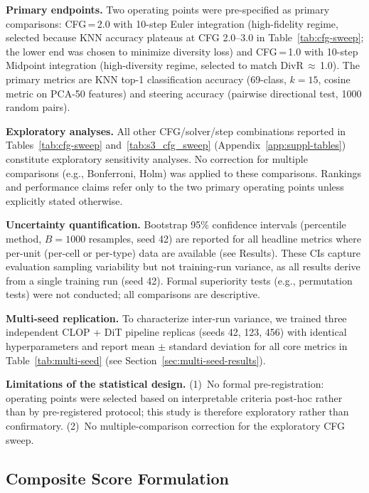 \documentclass[11pt,a4paper]{article}
\begin{document}
\textbf{Primary endpoints.} Two operating points were pre-specified as primary comparisons: CFG\,=\,2.0 with 10-step Euler integration (high-fidelity regime, selected because KNN accuracy plateaus at CFG 2.0--3.0 in Table~\ref{tab:cfg-sweep}; the lower end was chosen to minimize diversity loss) and CFG\,=\,1.0 with 10-step Midpoint integration (high-diversity regime, selected to match DivR\,$\approx$\,1.0). The primary metrics are KNN top-1 classification accuracy (69-class, $k{=}15$, cosine metric on PCA-50 features) and steering accuracy (pairwise directional test, 1000 random pairs).

\textbf{Exploratory analyses.} All other CFG/solver/step combinations reported in Tables~\ref{tab:cfg-sweep} and~\ref{tab:s3_cfg_sweep} (Appendix~\ref{app:suppl-tables}) constitute exploratory sensitivity analyses. No correction for multiple comparisons (e.g., Bonferroni, Holm) was applied to these comparisons. Rankings and performance claims refer only to the two primary operating points unless explicitly stated otherwise.

\textbf{Uncertainty quantification.} Bootstrap 95\% confidence intervals (percentile method, $B{=}1000$ resamples, seed 42) are reported for all headline metrics where per-unit (per-cell or per-type) data are available (see Results). These CIs capture evaluation sampling variability but not training-run variance, as all results derive from a single training run (seed 42). Formal superiority tests (e.g., permutation tests) were not conducted; all comparisons are descriptive.

\textbf{Multi-seed replication.} To characterize inter-run variance, we trained three independent CLOP + DiT pipeline replicas (seeds 42, 123, 456) with identical hyperparameters and report mean $\pm$ standard deviation for all core metrics in Table~\ref{tab:multi-seed} (see Section~\ref{sec:multi-seed-results}).

\textbf{Limitations of the statistical design.} (1)~No formal pre-registration: operating points were selected based on interpretable criteria post-hoc rather than by pre-registered protocol; this study is therefore exploratory rather than confirmatory. (2)~No multiple-comparison correction for the exploratory CFG sweep.

\subsection{Composite Score Formulation}\label{sec:composite}
\end{document}
